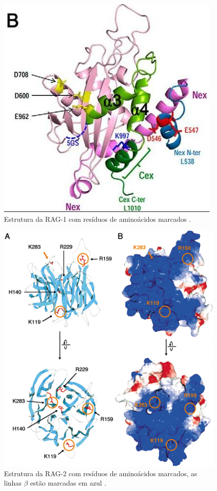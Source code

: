 \documentclass[
	12pt,				%
	openright,			%
	twoside,			%
	a4paper,			%
	]{abntex2}
\begin{document}

\begin{figure}
	\centering
	\includegraphics[width=0.5\linewidth]{RAG1stru2}
	\caption[Estrutura da RAG-1 com resíduos de aminoácidos marcados.]{Estrutura da RAG-1 com resíduos de aminoácidos marcados \cite{newandcool}.}
	\label{fig:rag1struMarked}
\end{figure}


\begin{figure}
	\centering
	\includegraphics[width=0.7\linewidth]{RAG2struMarked}
	\caption[Estrutura da RAG-2 com resíduos de aminoácidos marcados, as linhas \texorpdfstring{$ \beta $}{beta} estão marcadas em azul.]{Estrutura da RAG-2 com resíduos de aminoácidos marcados, as linhas $ \beta $ estão marcadas em azul \cite{newandcool}.}
	\label{fig:rag2struMarked}
\end{figure}
\end{document}
